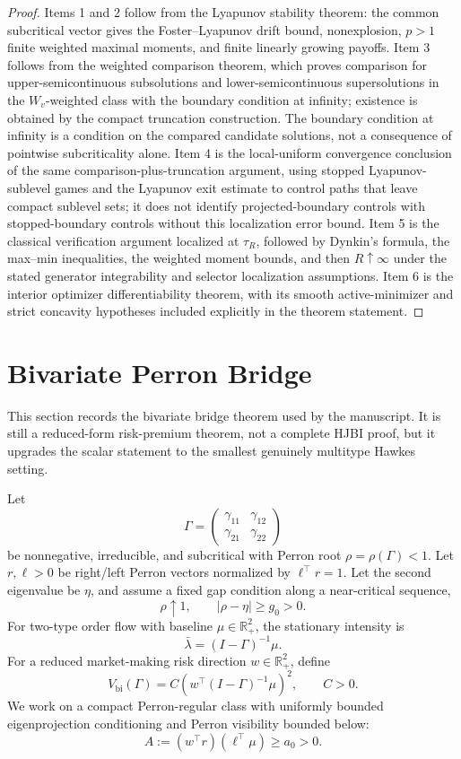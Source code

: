\documentclass[11pt]{article}
\newcommand{\R}{\mathbb{R}}
\begin{document}
\begin{proof}
Items 1 and 2 follow from the Lyapunov stability theorem: the common
subcritical vector gives the Foster--Lyapunov drift bound, nonexplosion,
$p>1$ finite weighted maximal moments, and finite linearly growing payoffs.
Item 3 follows from the weighted comparison theorem, which proves comparison for
upper-semicontinuous subsolutions and lower-semicontinuous supersolutions in
the $W_v$-weighted class with the boundary condition at infinity; existence is
obtained by the compact truncation construction. The boundary condition at
infinity is a condition on the compared candidate solutions, not a consequence
of pointwise subcriticality alone. Item 4 is the local-uniform convergence
conclusion of the same comparison-plus-truncation argument, using stopped
Lyapunov-sublevel games and the Lyapunov exit estimate to control paths that
leave compact sublevel sets; it does not identify projected-boundary controls
with stopped-boundary controls without this localization error bound. Item 5
is the classical verification argument localized at $\tau_R$, followed by
Dynkin's formula, the max--min inequalities, the weighted moment bounds, and
then $R\uparrow\infty$ under the stated generator integrability and selector
localization assumptions. Item 6 is the interior optimizer
differentiability theorem, with its smooth active-minimizer and strict
concavity hypotheses included explicitly in the theorem statement.
\end{proof}

\section{Bivariate Perron Bridge}

This section records the bivariate bridge theorem used by the manuscript. It is
still a reduced-form risk-premium theorem, not a complete HJBI proof, but it
upgrades the scalar statement to the smallest genuinely multitype Hawkes
setting.

Let
\[
\Gamma =
\begin{pmatrix}
\gamma_{11} & \gamma_{12}\\
\gamma_{21} & \gamma_{22}
\end{pmatrix}
\]
be nonnegative, irreducible, and subcritical with Perron root
$\rho=\rho(\Gamma)<1$. Let $r,\ell>0$ be right/left Perron vectors normalized
by $\ell^\top r=1$. Let the second eigenvalue be $\eta$, and assume a fixed
gap condition along a near-critical sequence,
\[
\rho\uparrow1,\qquad |\rho-\eta|\ge g_0>0.
\]
For two-type order flow with baseline $\mu\in\R^2_+$, the stationary intensity
is
\[
\bar\lambda=(I-\Gamma)^{-1}\mu.
\]
For a reduced market-making risk direction $w\in\R^2_+$, define
\[
V_{\mathrm{bi}}(\Gamma)
 =
C\left(w^\top (I-\Gamma)^{-1}\mu\right)^2,
\qquad C>0.
\]
We work on a compact Perron-regular class with uniformly bounded eigenprojection
conditioning and Perron visibility bounded below:
\[
A:=(w^\top r)(\ell^\top\mu)\ge a_0>0.
\]
\end{document}
